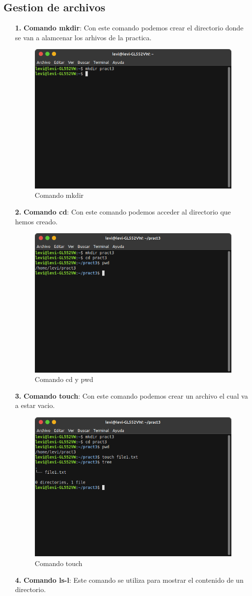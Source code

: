 \documentclass[11pt,twoside]{book}
\begin{document}
\subsection*{Gestion de archivos} 
\begin{enumerate}
    \item [\textbf{1.}] \textbf{Comando mkdir}: Con este comando podemos crear el directorio donde se van a alamcenar los arhivos de la practica.
    \begin{figure}[htb]
    \centering
    \includegraphics[width=0.5\linewidth]{introduccion/Lab3/mkdir.png}
    \caption{Comando mkdir}
   \label{fig:etiqueta}
    \end{figure}
    \item [\textbf{2.}] \textbf{Comando cd}: Con este comando podemos acceder al directorio que hemos creado.
    \begin{figure}[htb]
    \centering
    \includegraphics[width=0.6\linewidth]{introduccion/Lab3/cdpwd.png}
    \caption{Comando cd y pwd}
   \label{fig:etiqueta}
    \end{figure}
    \newpage
    \item [\textbf{3.}] \textbf{Comando touch}: Con este comando podemos crear un archivo el cual va a estar vacio. 
    \begin{figure}[htb]
    \centering
    \includegraphics[width=0.6\linewidth]{introduccion/Lab3/touch.png}
    \caption{Comando touch}
   \label{fig:etiqueta}
    \end{figure}
    \newpage
    \item [\textbf{4.}] \textbf{Comando ls-l}: Este comando se utiliza para mostrar el contenido de un directorio.
  

\end{enumerate}
\end{document}
